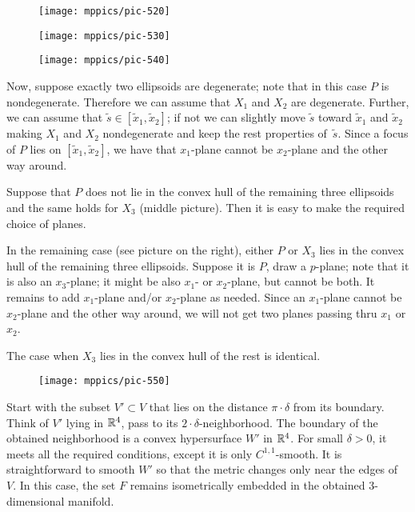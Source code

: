 \documentclass{article}
\begin{document}
\begin{figure}[!ht]
\begin{minipage}{.3\textwidth}
\centering
\texttt{[image: mppics/pic-520]}
\end{minipage}
\hfill
\begin{minipage}{.3\textwidth}
\centering
\texttt{[image: mppics/pic-530]}
\end{minipage}
\hfill
\begin{minipage}{.3\textwidth}
\centering
\texttt{[image: mppics/pic-540]}
\end{minipage}
\end{figure}

Now, suppose exactly two ellipsoids are degenerate; note that in this case $P$ is nondegenerate.
Therefore we can assume that $X_1$ and $X_2$ are degenerate.
Further, we can assume that $\tilde s\in[\tilde x_1,\tilde x_2]$;
if not we can slightly move $\tilde s$ toward $\tilde x_1$ and $\tilde x_2$ making $X_1$ and $X_2$ nondegenerate and keep the rest properties of~$\tilde s$.
Since a focus of $P$ lies on $[\tilde x_1,\tilde x_2]$, we have that $x_1$-plane cannot be $x_2$-plane and the other way around.

Suppose that $P$ does not lie in the convex hull of the remaining three ellipsoids
and the same holds for $X_3$ (middle picture).
Then it is easy to make the required choice of planes.

In the remaining case (see picture on the right), either $P$ or $X_3$ lies in the convex hull of the remaining three ellipsoids.
Suppose it is $P$, draw a $p$-plane; note that it is also an $x_3$-plane;
it might be also $x_1$- or $x_2$-plane, but cannot be both.
It remains to add $x_1$-plane and/or $x_2$-plane as needed.
Since an $x_1$-plane cannot be $x_2$-plane and the other way around, we will not get two planes passing thru $x_1$ or $x_2$.

The case when $X_3$ lies in the convex hull of the rest is identical.

\begin{wrapfigure}{r}{40mm}
\vskip-0mm
\centering
\texttt{[image: mppics/pic-550]}
\end{wrapfigure}

Start with the subset $V'\subset V$ that lies on the distance $\pi\cdot\delta$ from its boundary.
Think of $V'$ lying in $\mathbb{R}^4$, pass to its $2\cdot \delta$-neighborhood.
The boundary of the obtained neighborhood is a convex hypersurface $W'$ in $\mathbb{R}^4$.
For small $\delta>0$, it meets all the required conditions, except it is only $C^{1,1}$-smooth.
It is straightforward to smooth $W'$ so that the metric changes only near the edges of~$V$.
In this case, the set $F$ remains isometrically embedded in the obtained 3-dimensional manifold.
\qeds
\end{document}
